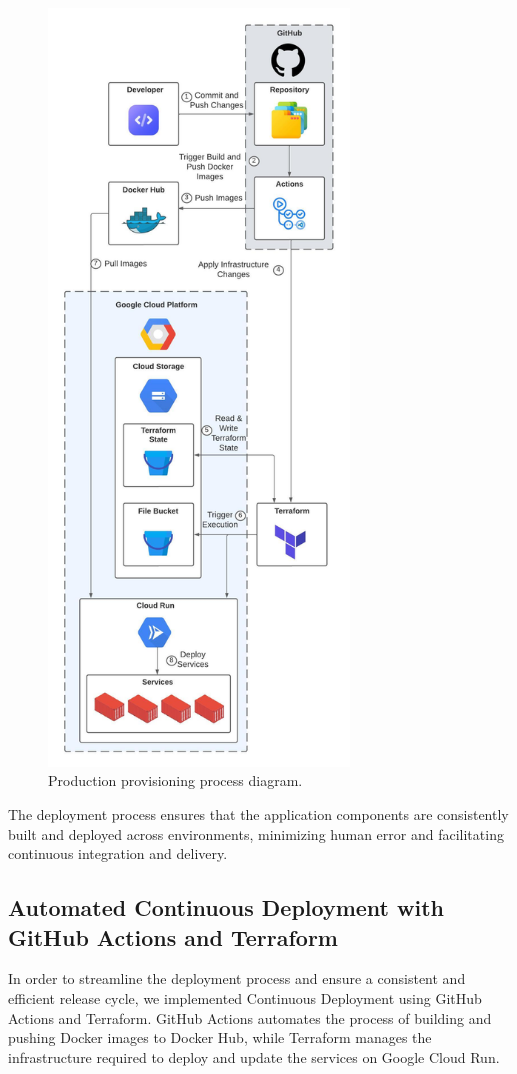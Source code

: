 \documentclass[a4paper,fleqn]{cas-dc}
\begin{document}
\begin{figure}[h]
\centering
\includegraphics[width=8cm]{Deployment.jpeg}
\caption{Production provisioning process diagram.}
\label{fig:deployment}
\end{figure}


The deployment process ensures that the application components are consistently built and deployed across environments, minimizing human error and facilitating continuous integration and delivery.

\subsection{Automated Continuous Deployment with GitHub Actions and Terraform}

In order to streamline the deployment process and ensure a consistent and efficient release cycle, we implemented Continuous Deployment using GitHub Actions and Terraform. GitHub Actions automates the process of building and pushing Docker images to Docker Hub, while Terraform manages the infrastructure required to deploy and update the services on Google Cloud Run.
\end{document}
